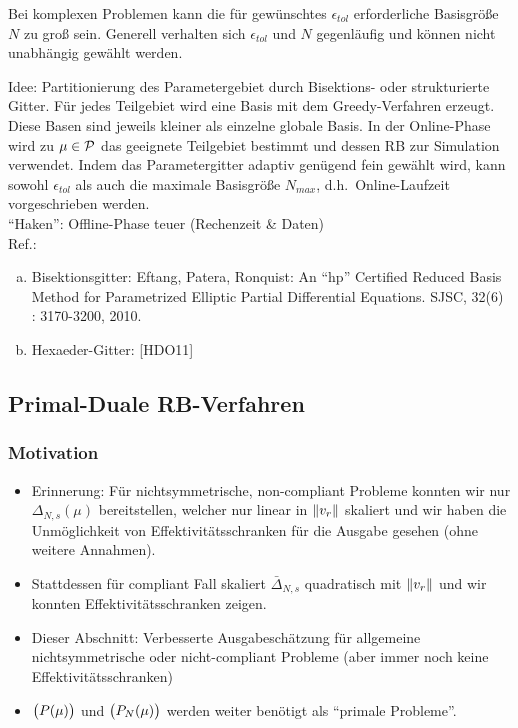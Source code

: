 \begin{bem}[Partitionsansätze]
	Bei komplexen Problemen kann die für gewünschtes $\epsilon_{tol}$ erforderliche Basisgröße $N$ zu groß sein.
	Generell verhalten sich $\epsilon_{tol}$ und $N$ gegenläufig und können nicht unabhängig gewählt werden.

	Idee: Partitionierung des Parametergebiet durch Bisektions- oder strukturierte Gitter.
	Für jedes Teilgebiet wird eine Basis mit dem Greedy-Verfahren erzeugt.
	Diese Basen sind jeweils kleiner als einzelne globale Basis.
	In der Online-Phase wird zu $\mu \in \mathcal{P}$ das geeignete Teilgebiet bestimmt und dessen RB zur Simulation verwendet.
	Indem das Parametergitter adaptiv genügend fein gewählt wird, kann sowohl $\epsilon_{tol}$ als auch die maximale Basisgröße $N_{max}$, d.h.\ Online-Laufzeit vorgeschrieben werden.\\
	``Haken'': Offline-Phase teuer (Rechenzeit \& Daten)\\
	Ref.:
	\begin{enumerate}[a)]
		\item Bisektionsgitter: Eftang, Patera, Ronquist: An ``hp'' Certified Reduced Basis Method for Parametrized Elliptic Partial Differential Equations. SJSC, 32(6) : 3170-3200, 2010.
		\item Hexaeder-Gitter: [HDO11]
	\end{enumerate}
\end{bem}

\subsection{Primal-Duale RB-Verfahren}
\label{sec-3.5}

\subsubsection*{Motivation}
\begin{itemize}
	\item Erinnerung: Für nichtsymmetrische, non-compliant Probleme konnten wir nur $\Delta_{N,s}(\mu)$ bereitstellen, welcher nur linear in $\|v_r\|$ skaliert und wir haben die Unmöglichkeit von Effektivitätsschranken für die Ausgabe gesehen (ohne weitere Annahmen).
	\item Stattdessen für compliant Fall skaliert $\bar\Delta_{N,s}$ quadratisch mit $\|v_r\|$ und wir konnten Effektivitätsschranken zeigen.
	\item Dieser Abschnitt: Verbesserte Ausgabeschätzung für allgemeine nichtsymmetrische oder nicht-compliant Probleme (aber immer noch keine Effektivitätsschranken)
	\item $\big(P(\mu)\big)$ und $\big(P_N(\mu)\big)$ werden weiter benötigt als ``primale Probleme''.
\end{itemize}

